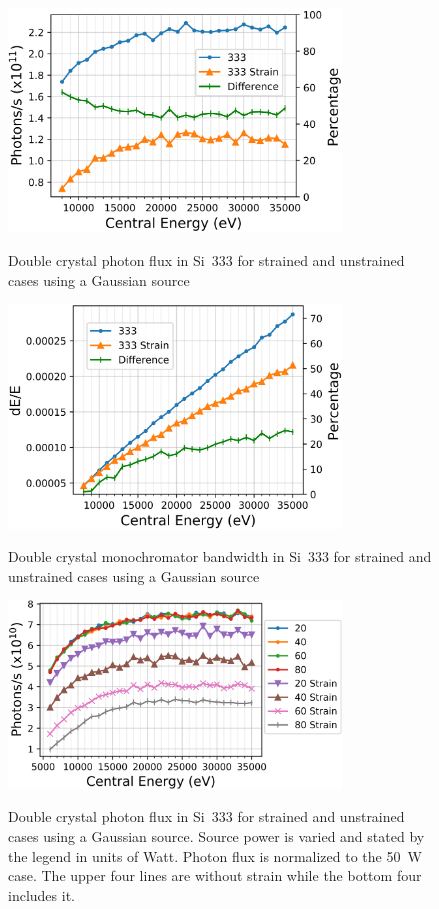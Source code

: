 \documentclass{iucr}
\begin{document}
\begin{figure}
\caption{Double crystal photon flux in Si~333 for strained and unstrained cases using a Gaussian source}
\includegraphics[width = 8.85cm]{images/333flux.png}
\label{fig:333flux}
\end{figure}

\begin{figure}
\caption{Double crystal monochromator bandwidth in Si~333 for strained and unstrained cases using a Gaussian source}
\includegraphics[width = 8.85cm]{images/333monobw.png}
\label{fig:333monobw}
\end{figure}

\begin{figure}
\caption{Double crystal photon flux in Si~333 for strained and unstrained cases using a Gaussian source. Source power is varied and stated by the legend in units of Watt. Photon flux is normalized to the 50~W case. The upper four lines are without strain while the bottom four includes it.}
\includegraphics[width = 8.85cm]{images/333strainpower.png}
\label{fig:333strainpower}
\end{figure}
\end{document}

